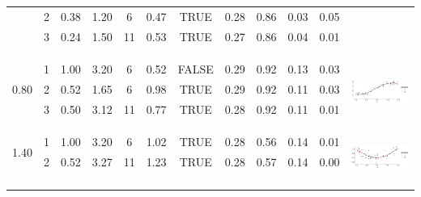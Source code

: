 \begin{table}
\begin{tabular}{ c c c c c c c c c c | c c}
 & 2 & 0.38 & 1.20 & 6 & 0.47 & TRUE & 0.28 & 0.86 & 0.03 & 0.05 & \\
 & 3 & 0.24 & 1.50 & 11 & 0.53 & TRUE & 0.27 & 0.86 & 0.04 & 0.01 & \\
 \\
 \\[1mm]
\arrayrulecolor{lightgray}\hline \\[-1mm]
\multirow{3}{*}{ 0.80} 
 & 1 & 1.00 & 3.20 & 6 & 0.52 & FALSE & 0.29 & 0.92 & 0.13 & 0.03 & \multirow{5}{*}{ \includegraphics[scale=0.20, trim = 0mm 10mm 0mm 3mm, clip]{fig9_diagnostic_6.png}}\\
 & 2 & 0.52 & 1.65 & 6 & 0.98 & TRUE & 0.29 & 0.92 & 0.11 & 0.03 & \\
 & 3 & 0.50 & 3.12 & 11 & 0.77 & TRUE & 0.28 & 0.92 & 0.11 & 0.01 & \\
 \\
 \\[1mm]
\arrayrulecolor{lightgray}\hline \\[-1mm]
\multirow{2}{*}{ 1.40} 
 & 1 & 1.00 & 3.20 & 6 & 1.02 & TRUE & 0.28 & 0.56 & 0.14 & 0.01 & \multirow{5}{*}{ \includegraphics[scale=0.20, trim = 0mm 10mm 0mm 3mm, clip]{fig9_diagnostic_7.png}}\\
 & 2 & 0.52 & 3.27 & 11 & 1.23 & TRUE & 0.28 & 0.57 & 0.14 & 0.00 & \\
 \\
 \\
 \\[1mm]
 \arrayrulecolor{lightgray}\hline \\[-1mm]

\end{tabular}
\end{table}
